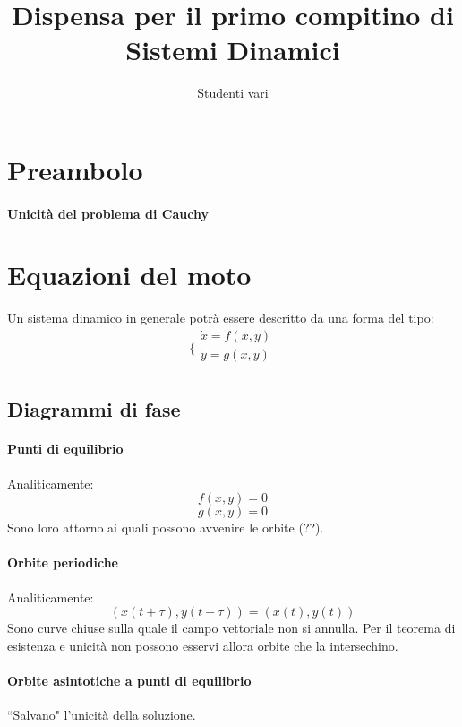 \documentclass[a4paper,12pt]{article}
\begin{document}
\begin{titlepage}
\title{Dispensa per il primo compitino di Sistemi Dinamici}
\author{Studenti vari}
\maketitle
\end{titlepage}
\begin{titlepage}
\tableofcontents
\end{titlepage}

\section{Preambolo}
\paragraph{Unicità del problema di Cauchy}

\section{Equazioni del moto}

Un sistema dinamico in generale potrà essere descritto da una forma del tipo:
$$\bigg\{ \begin{array}{l}
\dot{x} = f(x, y)\\
\dot{y} = g(x, y)\\
\end{array}$$

\subsection{Diagrammi di fase}
\paragraph{Punti di equilibrio} Analiticamente:
$$f(x, y) = 0$$ $$g(x, y) = 0$$
Sono loro attorno ai quali possono avvenire le orbite (??).
\paragraph{Orbite periodiche}
Analiticamente:
$$ ( x(t+\tau), y(t+\tau) ) = (x(t), y(t))$$
Sono curve chiuse sulla quale il campo vettoriale non si annulla.
Per il teorema di esistenza e unicità non possono esservi allora orbite che la intersechino.
\paragraph{Orbite asintotiche a punti di equilibrio}
``Salvano" l'unicità della soluzione.
\end{document}
